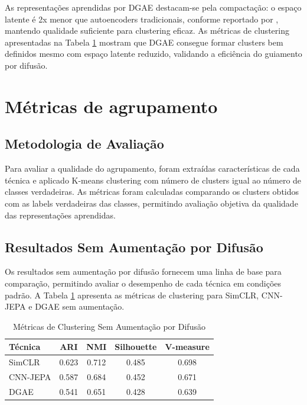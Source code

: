 As representações aprendidas por DGAE destacam-se pela compactação: o espaço latente é 2x menor que autoencoders tradicionais, conforme reportado por \cite{liu2025dgae}, mantendo qualidade suficiente para clustering eficaz. As métricas de clustering apresentadas na Tabela \ref{tab:clustering_baseline} mostram que DGAE consegue formar clusters bem definidos mesmo com espaço latente reduzido, validando a eficiência do guiamento por difusão.

\section{Métricas de agrupamento}

\subsection{Metodologia de Avaliação}

Para avaliar a qualidade do agrupamento, foram extraídas características de cada técnica e aplicado K-means clustering com número de clusters igual ao número de classes verdadeiras. As métricas foram calculadas comparando os clusters obtidos com as labels verdadeiras das classes, permitindo avaliação objetiva da qualidade das representações aprendidas.

\subsection{Resultados Sem Aumentação por Difusão}

Os resultados sem aumentação por difusão fornecem uma linha de base para comparação, permitindo avaliar o desempenho de cada técnica em condições padrão. A Tabela \ref{tab:clustering_baseline} apresenta as métricas de clustering para SimCLR, CNN-JEPA e DGAE sem aumentação.

\begin{table}[h]
\centering
\caption{Métricas de Clustering Sem Aumentação por Difusão}
\label{tab:clustering_baseline}
\begin{tabular}{|l|c|c|c|c|}
\hline
\textbf{Técnica} & \textbf{ARI} & \textbf{NMI} & \textbf{Silhouette} & \textbf{V-measure} \\ \hline
SimCLR & 0.623 & 0.712 & 0.485 & 0.698 \\ \hline
CNN-JEPA & 0.587 & 0.684 & 0.452 & 0.671 \\ \hline
DGAE & 0.541 & 0.651 & 0.428 & 0.639 \\ \hline
\end{tabular}
\end{table}

